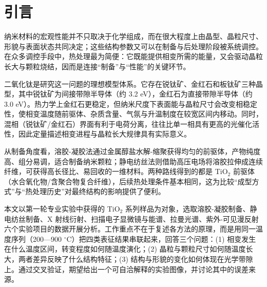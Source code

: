 \section{引\quad 言}

纳米材料的宏观性能并不只取决于化学组成，而在很大程度上由晶型、晶粒尺寸、形貌与表面状态共同决定；这些结构参数又可以在制备与后处理阶段被系统调控。在众多调控手段中，热处理最为简便：它既能提供相变所需的能量，又会驱动晶粒长大与颗粒烧结，因而是连接“制备”与“性能”的关键环节\cite{wang2005表征,li2008制备}。

二氧化钛是研究这一问题的理想模型体系。它存在锐钛矿、金红石和板钛矿三种晶型，其中锐钛矿为间接带隙半导体（约 3.2 eV），金红石为直接带隙半导体（约 3.0 eV）\cite{chen2007tio2}。热力学上金红石更稳定，但纳米尺度下表面能与晶粒尺寸会改变相稳定性，使相变温度随前驱体、杂质含量、气氛与升温制度在较宽区间内移动\cite{zhang2000phase}。同时，混相（锐钛矿/金红石）界面有利于电荷分离，往往比单一相具有更高的光催化活性\cite{ohtani1997mixture}，因此定量描述相变进程与晶粒长大规律具有实际意义。

从制备角度看，溶胶-凝胶法通过金属醇盐水解-缩聚获得均匀的前驱体，产物纯度高、组分易调，适合制备纳米颗粒；静电纺丝法则借助高压电场将溶胶拉伸成连续纤维，可获得高长径比、易回收的一维材料\cite{zhao2019静电纺丝}。两种路线得到的都是 TiO$_2$ 前驱体（水合氧化物/含聚合物复合纤维），后续热处理条件基本相同，这为比较“成型方式”与“热处理历史”对最终结构的影响提供了便利。

本文以第一轮专业实验中获得的 TiO$_2$ 系列样品为对象，选取溶胶-凝胶制备、静电纺丝制备、X 射线衍射、扫描电子显微镜与能谱、拉曼光谱、紫外-可见漫反射六个实验项目的数据开展分析。工作重点不在于复述各方法的原理，而是用同一温度序列（200—900 $^\circ$C）把四类表征结果串联起来，回答三个问题：(1) 相变发生在什么温度区间，转变程度如何随温度演化；(2) 晶粒与颗粒尺寸如何随温度长大，两者差异反映了什么结构特征；(3) 结构与形貌的变化如何体现在光学带隙上。通过交叉验证，期望给出一个可自洽解释的实验图像，并讨论其中的误差来源。
